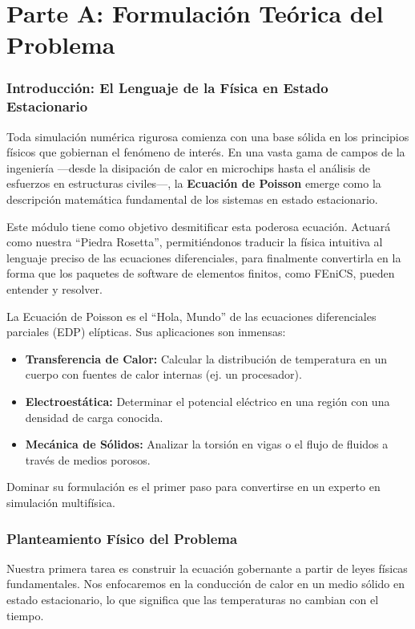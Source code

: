 \part*{Parte A: Formulación Teórica del Problema}

\section{Introducción: El Lenguaje de la Física en Estado Estacionario}
Toda simulación numérica rigurosa comienza con una base sólida en los principios físicos que gobiernan el fenómeno de interés. En una vasta gama de campos de la ingeniería —desde la disipación de calor en microchips hasta el análisis de esfuerzos en estructuras civiles—, la \textbf{Ecuación de Poisson} emerge como la descripción matemática fundamental de los sistemas en estado estacionario.

Este módulo tiene como objetivo desmitificar esta poderosa ecuación. Actuará como nuestra ``Piedra Rosetta'', permitiéndonos traducir la física intuitiva al lenguaje preciso de las ecuaciones diferenciales, para finalmente convertirla en la forma que los paquetes de software de elementos finitos, como FEniCS, pueden entender y resolver.

\begin{infobox}
    La Ecuación de Poisson es el ``Hola, Mundo'' de las ecuaciones diferenciales parciales (EDP) elípticas. Sus aplicaciones son inmensas:
    \begin{itemize}
        \item \textbf{Transferencia de Calor:} Calcular la distribución de temperatura en un cuerpo con fuentes de calor internas (ej. un procesador).
        \item \textbf{Electroestática:} Determinar el potencial eléctrico en una región con una densidad de carga conocida.
        \item \textbf{Mecánica de Sólidos:} Analizar la torsión en vigas o el flujo de fluidos a través de medios porosos.
    \end{itemize}
    Dominar su formulación es el primer paso para convertirse en un experto en simulación multifísica.
\end{infobox}

\section{Planteamiento Físico del Problema}
Nuestra primera tarea es construir la ecuación gobernante a partir de leyes físicas fundamentales. Nos enfocaremos en la conducción de calor en un medio sólido en estado estacionario, lo que significa que las temperaturas no cambian con el tiempo.

